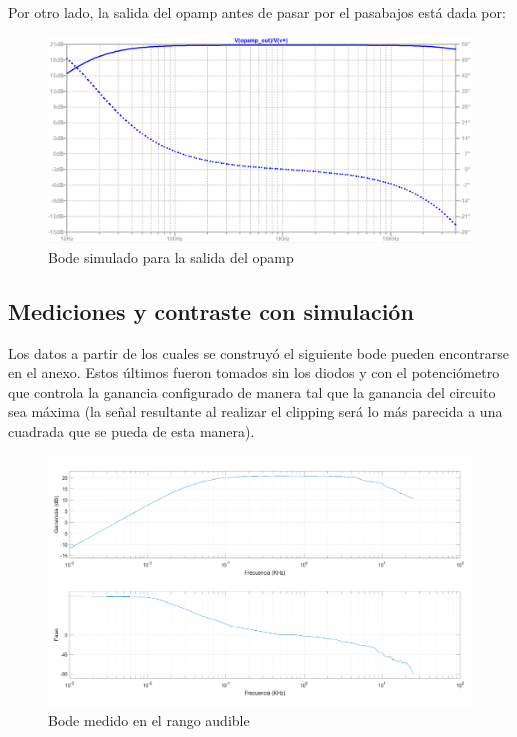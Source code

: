 \documentclass[../../main.tex]{subfiles}
\begin{document}
Por otro lado, la salida del opamp antes de pasar por el pasabajos está dada por:
\begin{figure}[H]
	\centering
	\includegraphics[scale=.4]{imagenes/bode_opamp_simulacion_300mv.png}
	\caption{Bode simulado para la salida del opamp}
	\label{fig:ej5_bode_opamp_simulacion_300mv}
\end{figure}

\subsection{Mediciones y contraste con simulación}

Los datos a partir de los cuales se construyó el siguiente bode pueden encontrarse en el anexo. Estos últimos fueron tomados sin los diodos y con el potenciómetro que controla la ganancia configurado de manera tal que la ganancia del circuito sea máxima (la señal resultante al realizar el clipping será lo más parecida a una cuadrada que se pueda de esta manera).

\begin{figure}[H]
	\centering
	\includegraphics[scale=.2]{imagenes/bode_mediciones.png}
	\caption{Bode medido en el rango audible}
	\label{fig:ej5_bode_mediciones}
\end{figure}
\end{document}
